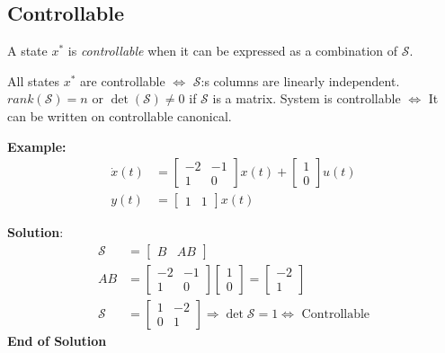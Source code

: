 \begin{multicols}{2}
\subsection{Controllable}
A state $x^*$ is \textit{controllable} when it can be expressed as a combination of $\mathcal{S}$.

All states $x^*$ are controllable $\Leftrightarrow$ $\mathcal{S}$:s columns are linearly independent.
$rank{(\mathcal{S})}=n$ or $\det{(\mathcal{S})} \neq 0$ if $\mathcal{S}$ is a matrix.
System is controllable $\Leftrightarrow$ It can be written on controllable canonical.

\textbf{Example:}
\begin{align*}
    \dot{x}(t) &= \begin{bmatrix} -2 & -1 \\ 1 & 0 \end{bmatrix}x(t) + \begin{bmatrix} 1 \\ 0 \end{bmatrix}u(t) \\
    y(t) &= \begin{bmatrix} 1 & 1 \end{bmatrix}x(t)
\end{align*}

\textbf{Solution}:
\begin{align*} 
    \mathcal{S} &= \begin{bmatrix} B & AB \end{bmatrix} \\
    AB &= \begin{bmatrix} -2 & -1 \\ 1 & 0 \end{bmatrix}\begin{bmatrix} 1 \\ 0 \end{bmatrix} = \begin{bmatrix} -2 \\ 1 \end{bmatrix} \\
    \mathcal{S} &= \begin{bmatrix} 1 & -2 \\ 0 & 1 \end{bmatrix} \Rightarrow \det\mathcal{S} = 1 \Leftrightarrow \text{ Controllable}
\end{align*}
\textbf{End of Solution}



\end{multicols}
